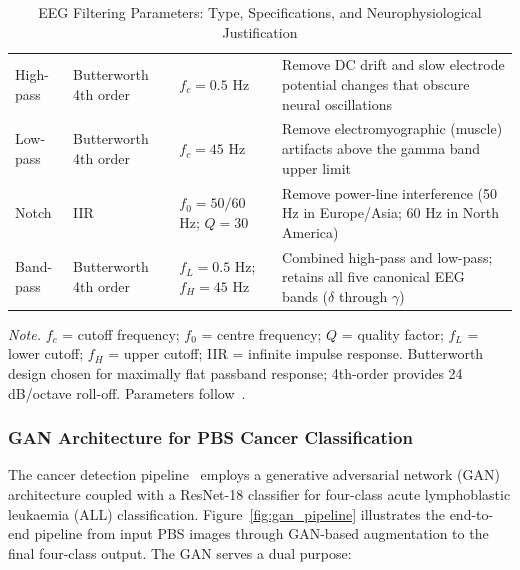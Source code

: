 {\tablestripes\tablefontsize
{}
\begin{xltabular}{\textwidth}{@{} >{\raggedright\arraybackslash}p{1.8cm} >{\raggedright\arraybackslash}p{2.8cm} >{\raggedright\arraybackslash}p{3.6cm} L @{}}
\caption[EEG Filtering Parameters and Justification]{EEG Filtering Parameters: Type, Specifications, and Neurophysiological Justification}\label{tab:eeg_filter_params} \\
\toprule
{} &  &  &  \\
\midrule
\endfirsthead
\endhead
\bottomrule
\endlastfoot
High-pass & Butterworth 4th order & $f_c = 0.5$ Hz & Remove DC drift and slow electrode potential changes that obscure neural oscillations \\
\addlinespace
Low-pass & Butterworth 4th order & $f_c = 45$ Hz & Remove electromyographic (muscle) artifacts above the gamma band upper limit \\
\addlinespace
Notch & IIR & $f_0 = 50/60$ Hz; $Q = 30$ & Remove power-line interference (50 Hz in Europe/Asia; 60 Hz in North America) \\
\addlinespace
Band-pass & Butterworth 4th order & $f_L = 0.5$ Hz; $f_H = 45$ Hz & Combined high-pass and low-pass; retains all five canonical EEG bands ($\delta$ through $\gamma$) \\
\end{xltabular}}
\vspace{0.5em}\noindent\textit{Note.} $f_c$ = cutoff frequency; $f_0$ = centre frequency; $Q$ = quality factor; $f_L$ = lower cutoff; $f_H$ = upper cutoff; IIR = infinite impulse response. Butterworth design chosen for maximally flat passband response; 4th-order provides 24 dB/octave roll-off. Parameters follow~\cite{asthana2025eegmaster}.

\iffalse
\clearpage


\subsubsection{GAN Architecture for PBS Cancer Classification}
\label{sec:gan_cancer_architecture}

The cancer detection pipeline~\cite{asthana2025cancer} employs a generative adversarial network (GAN) architecture coupled with a ResNet-18 classifier for four-class acute lymphoblastic leukaemia (ALL) classification. Figure~\ref{fig:gan_pipeline} illustrates the end-to-end pipeline from input PBS images through GAN-based augmentation to the final four-class output. The GAN serves a dual purpose:

